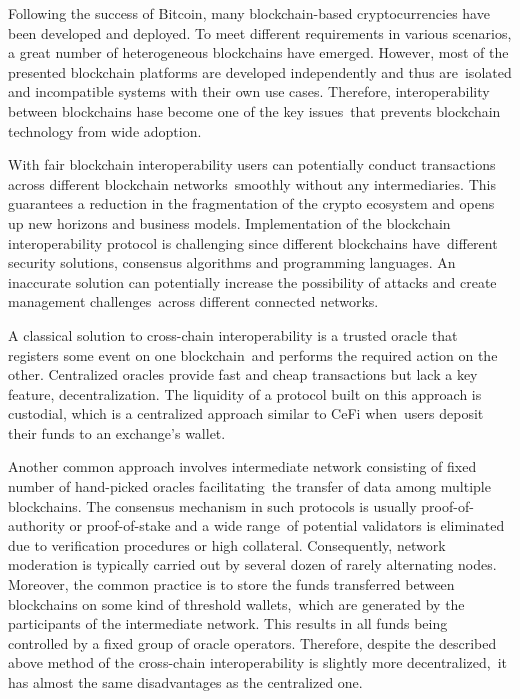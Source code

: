 Following the success of Bitcoin, many blockchain-based cryptocurrencies have been developed and deployed.
To meet different requirements in various scenarios, a great number of heterogeneous blockchains have emerged.
However, most of the presented blockchain platforms are developed independently and thus are\
isolated and incompatible systems with their own use cases.
Therefore, interoperability between blockchains hase become one of the key issues\
that prevents blockchain technology from wide adoption.

With fair blockchain interoperability users can potentially conduct transactions across different blockchain networks\
smoothly without any intermediaries.
This guarantees a reduction in the fragmentation of the crypto ecosystem and opens up new horizons and business models.
Implementation of the blockchain interoperability protocol is challenging since different blockchains have\
different security solutions, consensus algorithms and programming languages.
An inaccurate solution can potentially increase the possibility of attacks and create management challenges\
across different connected networks.

A classical solution to cross-chain interoperability is a trusted oracle that registers some event on one blockchain\
and performs the required action on the other.
Centralized oracles provide fast and cheap transactions but lack a key feature, decentralization.
The liquidity of a protocol built on this approach is custodial, which is a centralized approach similar to CeFi when\
users deposit their funds to an exchange's wallet.

Another common approach involves intermediate network consisting of fixed number of hand-picked oracles facilitating\
the transfer of data among multiple blockchains.
The consensus mechanism in such protocols is usually proof-of-authority or proof-of-stake and a wide range\
of potential validators is eliminated due to verification procedures or high collateral.
Consequently, network moderation is typically carried out by several dozen of rarely alternating nodes.
Moreover, the common practice is to store the funds transferred between blockchains on some kind of threshold wallets,\
which are generated by the participants of the intermediate network.
This results in all funds being controlled by a fixed group of oracle operators.
Therefore, despite the described above method of the cross-chain interoperability is slightly more decentralized,\
it has almost the same disadvantages as the centralized one.

